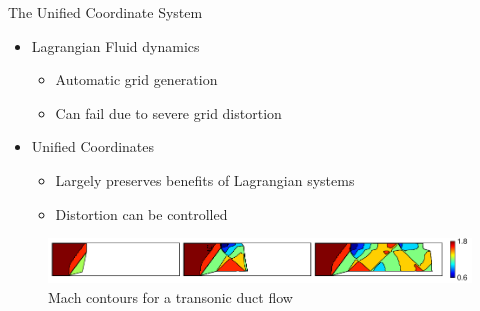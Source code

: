 \documentclass{beamer}
\begin{document}


\begin{frame}{The Unified Coordinate System}
  \begin{itemize}
    \item Lagrangian Fluid dynamics
      \vspace{.025in}
      \begin{itemize}
        \item Automatic grid generation
        \item Can fail due to severe grid distortion
      \end{itemize}
      \vspace{.025in}
    \item Unified Coordinates
      \vspace{.025in}
      \begin{itemize}
        \item Largely preserves benefits of Lagrangian systems
        \item Distortion can be controlled
      \end{itemize}
  \end{itemize}
  \begin{figure}
    \vspace{.125in}
    \includegraphics[width=\textwidth]{Channel_flow_filmstrip_image_mach.pdf}
    \caption{Mach contours for a transonic duct flow}
  \end{figure}
\end{frame}
\end{document}
